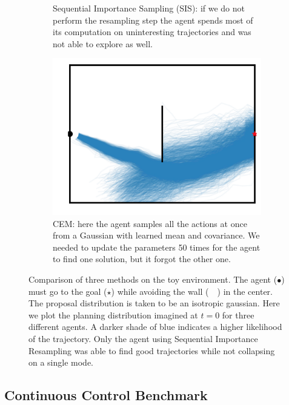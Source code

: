 \begin{figure}
\begin{subfigure}{.295\textwidth}
\caption{Sequential Importance Sampling (SIS): if we do not perform the resampling step the agent spends most of its computation on uninteresting trajectories and was not able to explore as well.\vspace{1em}}
\label{fig:toy_sis}
\end{subfigure}\hspace{0.05\linewidth}
\begin{subfigure}{.295\textwidth}
\centering
\includegraphics[width=\linewidth, trim={1.1cm 0cm .5cm 0cm},clip]{articles/smcp/figures/cem.png}
\caption{CEM: here the agent samples all the actions at once from a Gaussian with learned mean and covariance. We needed to update the parameters 50 times for the agent to find one solution, but it forgot the other one. }
\label{fig:toy_cem}
\end{subfigure}
\caption{Comparison of three methods on the toy environment. The agent ($\bullet$) must go to the goal ({\color{red}$\star$}) while avoiding the wall (\ \textbf{\textbar}\ ) in the center. The proposal distribution is taken to be an isotropic gaussian.  Here we plot the planning distribution imagined at $t=0$ for three different agents.  A darker shade of blue indicates a higher likelihood of the trajectory. Only the agent using Sequential Importance Resampling was able to find good trajectories while not collapsing on a single mode.}
\label{fig:toy}
\end{figure}

\subsection{Continuous Control Benchmark}
\label{sec:exp}

